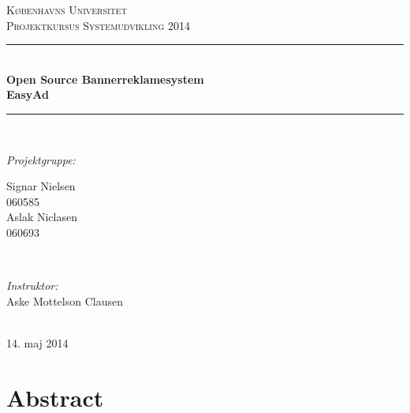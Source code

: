 \documentclass[a4paper,12pt]{article}
\begin{document}
\begin{titlepage}


\newcommand{\HRule}{\rule{\linewidth}{0.5mm}} %

\center %

\textsc{\LARGE Københavns Universitet}\\[1.5cm] %
\textsc{\Large Projektkursus Systemudvikling 2014}\\[0.5cm] %

\HRule \\[0.4cm]
{  \bfseries \large Open Source Bannerreklamesystem \\ \huge EasyAd}\\[0.4cm] %
\HRule \\[1.5cm]

\begin{minipage}[t]{0.4\textwidth}
\begin{flushleft} \large
\emph{Projektgruppe:}


Signar Nielsen %
\\
060585
\newline
\\
Aslak Niclasen
\\
060693
\end{flushleft}
\end{minipage}
~
\begin{minipage}[t]{0.4\textwidth}
\begin{flushright} \large
\emph{Instruktor:} \\
Aske Mottelson Clausen %
\end{flushright}
\end{minipage}\\[4cm]

{\large 14. maj 2014}\\[3cm] %

\end{titlepage}

\tableofcontents %


\clearpage %

\section{Abstract}
\end{document}
